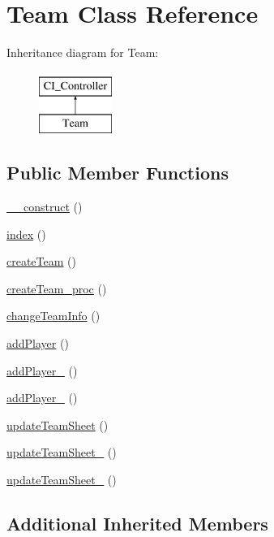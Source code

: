 \hypertarget{class_team}{}\section{Team Class Reference}
\label{class_team}
Inheritance diagram for Team\+:\begin{figure}[H]
\begin{center}
\leavevmode
\includegraphics[height=2.000000cm]{class_team}
\end{center}
\end{figure}
\subsection*{Public Member Functions}
\begin{DoxyCompactItemize}
\item 
\hyperlink{class_team_a095c5d389db211932136b53f25f39685}{\+\_\+\+\_\+construct} ()
\item 
\hyperlink{class_team_a149eb92716c1084a935e04a8d95f7347}{index} ()
\item 
\hyperlink{class_team_a36a67d958d920277b1e45be6a8d0227b}{create\+Team} ()
\item 
\hyperlink{class_team_a0e374aca34aaa9dedb6b141cb4289d9d}{create\+Team\+\_\+proc} ()
\item 
\hyperlink{class_team_a76ff99a950746cc52e5679f4c7b750ad}{change\+Team\+Info} ()
\item 
\hyperlink{class_team_a89d205383dce427906c6018364739647}{add\+Player} ()
\item 
\hyperlink{class_team_ac87c262ee4f896141056ded408007087}{add\+Player\+\_} ()
\item 
\hyperlink{class_team_a29080b41e053ae9ff6e9a407d9b2b680}{add\+Player\+\_} ()
\item 
\hyperlink{class_team_a1feeb77d111e0f36eb096fe8fc07393a}{update\+Team\+Sheet} ()
\item 
\hyperlink{class_team_ac4ed7d27dfdc25d17bcb915dec01e6b2}{update\+Team\+Sheet\+\_} ()
\item 
\hyperlink{class_team_a370cca7f8e17ca3168d580e24eaaf8d8}{update\+Team\+Sheet\+\_} ()
\end{DoxyCompactItemize}
\subsection*{Additional Inherited Members}


